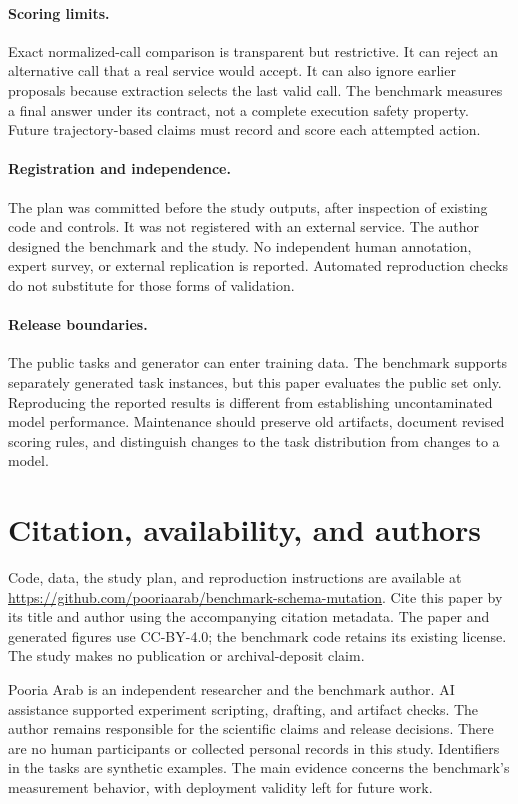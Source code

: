 \documentclass{article}
\begin{document}
\paragraph{Scoring limits.} Exact normalized-call comparison is transparent but restrictive. It can reject an alternative call that a real service would accept. It can also ignore earlier proposals because extraction selects the last valid call. The benchmark measures a final answer under its contract, not a complete execution safety property. Future trajectory-based claims must record and score each attempted action.
\paragraph{Registration and independence.} The plan was committed before the study outputs, after inspection of existing code and controls. It was not registered with an external service. The author designed the benchmark and the study. No independent human annotation, expert survey, or external replication is reported. Automated reproduction checks do not substitute for those forms of validation.
\paragraph{Release boundaries.} The public tasks and generator can enter training data. The benchmark supports separately generated task instances, but this paper evaluates the public set only. Reproducing the reported results is different from establishing uncontaminated model performance. Maintenance should preserve old artifacts, document revised scoring rules, and distinguish changes to the task distribution from changes to a model.
\section{Citation, availability, and authors}
Code, data, the study plan, and reproduction instructions are available at \url{https://github.com/pooriaarab/benchmark-schema-mutation}. Cite this paper by its title and author using the accompanying citation metadata. The paper and generated figures use CC-BY-4.0; the benchmark code retains its existing license. The study makes no publication or archival-deposit claim.\par
Pooria Arab is an independent researcher and the benchmark author. AI assistance supported experiment scripting, drafting, and artifact checks. The author remains responsible for the scientific claims and release decisions. There are no human participants or collected personal records in this study. Identifiers in the tasks are synthetic examples. The main evidence concerns the benchmark's measurement behavior, with deployment validity left for future work.\par


\end{document}
